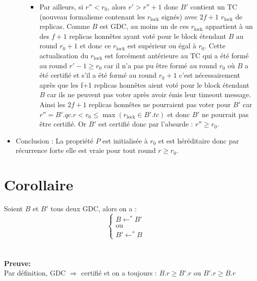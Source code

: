 \documentclass{article}
\begin{document}
\begin{itemize}
\begin{itemize}
\begin{itemize}
                    \item Par ailleurs, si \(r''<r_0\), alors \(r' > r''+1\) donc \(B'\) contient un TC (nouveau formalisme contenant les $r_{\text{lock}}$ signés) avec \(2f+1\) $r_{\text{lock}}$ de replicas. Comme \(B\) est GDC, au moins un de ces $r_{\text{lock}}$ appartient à un des \(f+1\) replicas honnêtes ayant voté pour le block étendant \(B\) au round \(r_0+1\) et donc ce $r_{\text{lock}}$ est supérieur ou égal à \(r_0\). Cette actualisation du $r_{\text{lock}}$ est forcément antérieure au TC qui a été formé au round \(r'-1\)\(\geq r_0\) car il n'a pas pu être formé au round \(r_0\) où \(B\) a été certifié et s'il a été formé au round \(r_0 +1\) c'est nécessairement après que les f+1 replicas honnêtes aient voté pour le block étendant \(B\) car ils ne peuvent pas voter après avoir émis leur timeout message. Ainsi les \(2f+1\) replicas honnêtes ne pourraient pas voter pour \(B'\) car\\ \(r'' = B'.qc.r < r_0 \leq \max(r_{\text{lock}} \in B'.tc)\) et donc \(B'\) ne pourrait pas être certifié. Or \(B'\) est certifié donc par l'absurde : \(r'' \geq r_0\).
                \end{itemize}
                
            \end{itemize}
        \item Conclusion : La propriété \(P\) est initialisée à \(r_0\) et est héréditaire donc par récurrence forte elle est vraie pour tout round \(r \geq r_0\).
\end{itemize}

\section*{Corollaire}
Soient \(B\) et \(B'\) tous deux GDC, alors on a :
\[
\left\{
\begin{array}{l}
B \leftarrow^* B' \quad \\ \text{ou} \\
B' \leftarrow^* B
\end{array}
\right.
\]
\\
\\
\textbf{Preuve:}\\
Par définition, GDC \(\Rightarrow\) certifié et on a toujours : \(B.r \geq B'.r\) ou \(B'.r \geq B.r\)
\end{document}
